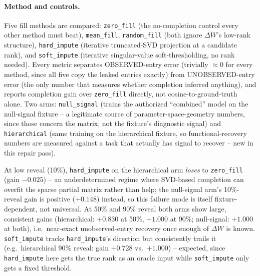 \documentclass[11pt]{article}
\begin{document}
\paragraph{Method and controls.} Five fill methods are compared:
\texttt{zero\_fill} (the no-completion control every other method must
beat), \texttt{mean\_fill}, \texttt{random\_fill} (both ignore
$\Delta W$'s low-rank structure), \texttt{hard\_impute} (iterative
truncated-SVD projection at a candidate rank), and \texttt{soft\_impute}
(iterative singular-value soft-thresholding, no rank needed). Every metric
separates OBSERVED-entry error (trivially $\approx 0$ for every method,
since all five copy the leaked entries exactly) from UNOBSERVED-entry
error (the only number that measures whether completion inferred
anything), and reports completion gain over \texttt{zero\_fill} directly,
not cosine-to-ground-truth alone. Two arms: \texttt{null\_signal} (trains
the authorized ``combined'' model on the null-signal fixture -- a
legitimate source of parameter-space-geometry numbers, since those concern
the matrix, not the fixture's diagnostic signal) and \texttt{hierarchical}
(same training on the hierarchical fixture, so functional-recovery numbers
are measured against a task that actually has signal to recover -- new in
this repair pass).

\label{tab:phase3-adapter-recovery-gain}
At low reveal (10\%), \texttt{hard\_impute} on the hierarchical arm
\emph{loses} to \texttt{zero\_fill} (gain $-0.025$) -- an underdetermined
regime where SVD-based completion can overfit the sparse partial matrix
rather than help; the null-signal arm's 10\%-reveal gain is positive
($+0.148$) instead, so this failure mode is itself fixture-dependent, not
universal. At 50\% and 90\% reveal both arms show large, consistent gains
(hierarchical: $+0.830$ at 50\%, $+1.000$ at 90\%; null-signal: $+1.000$ at
both), i.e.\ near-exact unobserved-entry recovery once enough of
$\Delta W$ is known. \texttt{soft\_impute} tracks \texttt{hard\_impute}'s
direction but consistently trails it (e.g.\ hierarchical 90\% reveal: gain
$+0.728$ vs.\ $+1.000$) -- expected, since \texttt{hard\_impute} here gets
the true rank as an oracle input while \texttt{soft\_impute} only gets a
fixed threshold.
\end{document}

